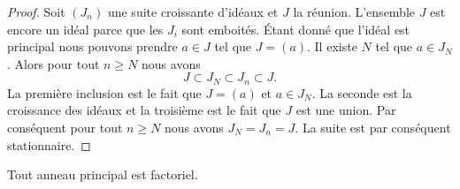 \begin{proof}
    Soit \( (J_n)\) une suite croissante d'idéaux et \( J\) la réunion. L'ensemble \( J\) est encore un idéal parce que les \( J_i\) sont emboités. Étant donné que l'idéal est principal nous pouvons prendre \( a\in J\) tel que \( J=(a)\). Il existe \( N\) tel que \( a\in J_N\). Alors pour tout \( n\geq N\) nous avons
    \begin{equation}
        J\subset J_N\subset J_n\subset J.
    \end{equation}
    La première inclusion est le fait que \( J=(a)\) et \( a\in J_N\). La seconde est la croissance des idéaux et la troisième est le fait que \( J\) est une union. Par conséquent pour tout \( n\geq N\) nous avons \( J_N=J_n=J\). La suite est par conséquent stationnaire.
\end{proof}

\begin{theorem}      \label{THOooANCAooBChmwp}
    Tout anneau principal est factoriel.
\end{theorem}

